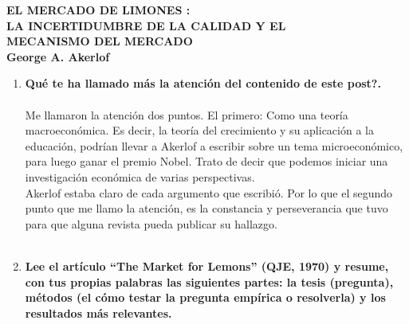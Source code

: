 \begin{center}
    \large
    \textbf{EL MERCADO DE LIMONES :\\
    LA INCERTIDUMBRE DE LA CALIDAD Y EL \\
    MECANISMO DEL MERCADO}\\
    \vspace{.5cm}
    \normalsize
    \textbf{George A. Akerlof}
\end{center}

\vspace{2cm}

\begin{enumerate}[\bfseries 1.]

    \item \textbf{Qué te ha llamado más la atención del contenido de este post?.}\\\\

	Me llamaron la atención dos puntos. El primero: Como una teoría macroeconómica. Es decir, la teoría del crecimiento y su aplicación a la educación, podrían llevar a Akerlof a escribir sobre un tema microeconómico, para luego ganar el premio Nobel. Trato de decir que podemos iniciar una investigación económica de varias perspectivas. \\
	 Akerlof estaba claro de cada argumento que escribió. Por lo que el segundo punto que me llamo la atención, es la constancia y perseverancia que tuvo para que alguna revista pueda publicar su hallazgo. \\\\

    \item \textbf{Lee el artículo “The Market for Lemons” (QJE, 1970) y resume, con tus propias palabras las siguientes partes: la tesis (pregunta), métodos (el cómo testar la pregunta empírica o resolverla) y los resultados más relevantes.}

\end{enumerate}
